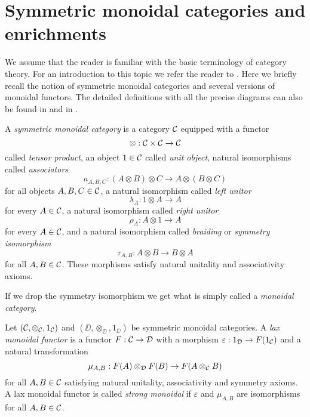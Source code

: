\documentclass[Thesis.tex]{subfiles}
\begin{document}
\section{Symmetric monoidal categories and enrichments}\label{back1}

We assume that the reader is familiar with the basic terminology of category theory. For an introduction to this topic we refer the reader to \cite{maclane}. Here we briefly recall the notion of symmetric monoidal categories and several versions of monoidal functors. The detailed definitions with all the precise diagrams can also be found in \cite{maclane} and in \cite{borceux}.

\begin{defin}
A \emph{symmetric monoidal category} is a category ${\mathcal C}$ equipped with a functor 
\[\otimes:{\mathcal C}\times{\mathcal C}\to{\mathcal C}\]
called \emph{tensor product}, an object $1\in{\mathcal C}$
called \emph{unit object}, natural isomorphisms called \emph{associators}
\[a_{A,B,C} : (A \otimes B) \otimes C \to A \otimes (B \otimes C)\]
for all objects $A,B,C\in{\mathcal C}$, a natural isomorphism called \emph{left unitor}
\[\lambda_A:1\otimes A\to A\]
for every $A\in{\mathcal C}$, a natural isomorphism  called \emph{right unitor}
\[\rho_A:A\otimes 1\to A\]
for every $A\in{\mathcal C}$, and a natural isomorphism called \emph{braiding} or \emph{symmetry isomorphism}
\[\tau_{A,B}:A\otimes B \to B\otimes A\]
for all $A,B\in{\mathcal C}$. These morphisms satisfy natural unitality and associativity axioms.
\end{defin}

\begin{remark}
If we drop the symmetry isomorphism we get what is simply called a \emph{monoidal category}.
\end{remark}

\begin{defin}
Let $({\mathcal C},\otimes_{\mathcal C}, 1_{\mathcal C})$ and $(\DD, \otimes_\DD, 1_\DD)$ be symmetric monoidal categories. A \emph{lax monoidal functor} is a functor $F:{\mathcal C}\to{\mathcal D}$ with a morphism $\varepsilon:1_{\mathcal D}\to F(1_{\mathcal C})$
and a natural transformation
\[\mu_{A,B}:F(A)\otimes_{\mathcal D}  F(B)\to F(A\otimes_{\mathcal C} B)\]
for all $A,B\in{\mathcal C}$ satisfying natural unitality, associativity and symmetry axioms. A lax monoidal functor is called \emph{strong monoidal} if $\varepsilon$ and $\mu_{A,B}$ are isomorphisms for all $A,B\in{\mathcal C}$.
\end{defin}
\end{document}
